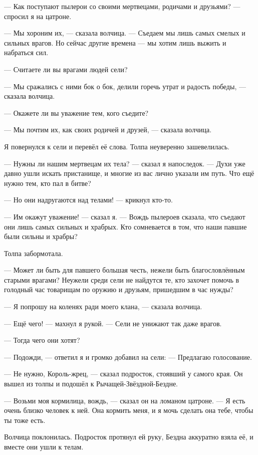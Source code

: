 --- Как поступают пылерои со своими мертвецами, родичами и друзьями? --- спросил я на цатроне.

--- Мы хороним их, --- сказала волчица.
--- Съедаем мы лишь самых смелых и сильных врагов.
Но сейчас другие времена --- мы хотим лишь выжить и набраться сил.

--- Считаете ли вы врагами людей сели?

--- Мы сражались с ними бок о бок, делили горечь утрат и радость победы, --- сказала волчица.

--- Окажете ли вы уважение тем, кого съедите?

--- Мы почтим их, как своих родичей и друзей, --- сказала волчица.

Я повернулся к сели и перевёл её слова.
Толпа неуверенно зашевелилась.

--- Нужны ли нашим мертвецам их тела? --- сказал я напоследок.
--- Духи уже давно ушли искать пристанище, и многие из вас лично указали им путь.
Что ещё нужно тем, кто пал в битве?

--- Но они надругаются над телами! --- крикнул кто-то.

--- Им окажут уважение! --- сказал я.
--- Вождь пылероев сказала, что съедают они лишь самых сильных и храбрых.
Кто сомневается в том, что наши павшие были сильны и храбры?

Толпа забормотала.

--- Может ли быть для павшего большая честь, нежели быть благословлённым старыми врагами?
Неужели среди сели не найдутся те, кто захочет помочь в голодный час товарищам по оружию и друзьям, пришедшим в час нужды?

--- Я попрошу на коленях ради моего клана, --- сказала волчица.

--- Ещё чего! --- махнул я рукой.
--- Сели не унижают так даже врагов.

--- Тогда чего они хотят?

--- Подожди, --- ответил я и громко добавил на сели:
--- Предлагаю голосование.

--- Не нужно, Король-жрец, --- сказал подросток, стоявший у самого края.
Он вышел из толпы и подошёл к Рычащей-Звёздной-Бездне.

--- Возьми моя кормилица, вождь, --- сказал он на ломаном цатроне.
--- Я есть очень близко человек к ней.
Она кормить меня, и я мочь сделать она тебе, чтобы ты тоже есть.

Волчица поклонилась.
Подросток протянул ей руку, Бездна аккуратно взяла её, и вместе они ушли к телам.

